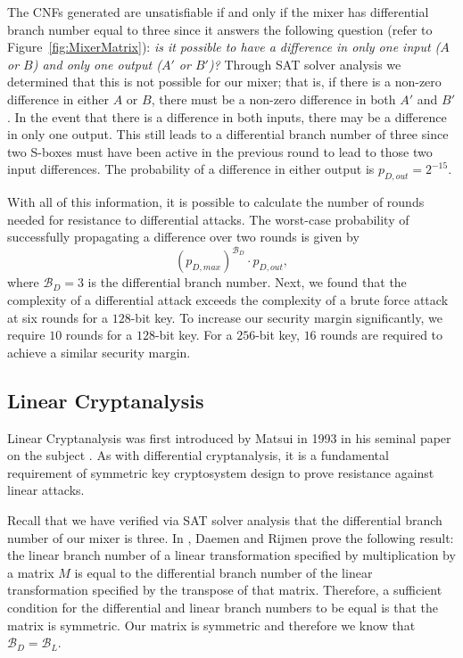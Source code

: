 The CNFs generated are unsatisfiable if and only if the mixer has differential branch number equal to three since it answers the following question (refer to Figure~\ref{fig:MixerMatrix}): \emph{is it possible to have a difference in only one input ($A$ or $B$) and only one output ($A'$ or $B'$)?}
Through SAT solver analysis we determined that this is not possible for our mixer; that is, if there is a non-zero difference in either $A$ or $B$, there must be a non-zero difference in both $A'$ and $B'$.
In the event that there is a difference in both inputs, there may be a difference in only one output.
This still leads to a differential branch number of three since two S-boxes must have been active in the previous round to lead to those two input differences.
The probability of a difference in either output is $p_{D,out} = 2^{-15}$.

With all of this information, it is possible to calculate the number of rounds needed for resistance to differential attacks.
The worst-case probability of successfully propagating a difference over two rounds is given by
\begin{equation*}
(p_{D,max})^{\mathcal{B}_D} \cdot p_{D,out},
\end{equation*}
where $\mathcal{B}_D = 3$ is the differential branch number.
Next, we found that the complexity of a differential attack exceeds the complexity of a brute force attack at six rounds for a $128$-bit key.
To increase our security margin significantly, we require $10$ rounds for a $128$-bit key. 
For a $256$-bit key, $16$ rounds are required to achieve a similar security margin.

\subsection{Linear Cryptanalysis}
Linear Cryptanalysis was first introduced by Matsui in 1993 in his seminal paper on the subject \cite{Matsui1993_Linear}.
As with differential cryptanalysis, it is a fundamental requirement of symmetric key cryptosystem design to prove resistance against linear attacks.

Recall that we have verified via SAT solver analysis that the differential branch number of our mixer is three.
In \cite{Daemen2002_DesignOfRijndael}, Daemen and Rijmen prove the following result: the linear branch number of a linear transformation specified by multiplication by a matrix $M$ is equal to the differential branch number of the linear transformation specified by the transpose of that matrix.
Therefore, a sufficient condition for the differential and linear branch numbers to be equal is that the matrix is symmetric.
Our matrix is symmetric and therefore we know that $\mathcal{B}_D = \mathcal{B}_L$.

